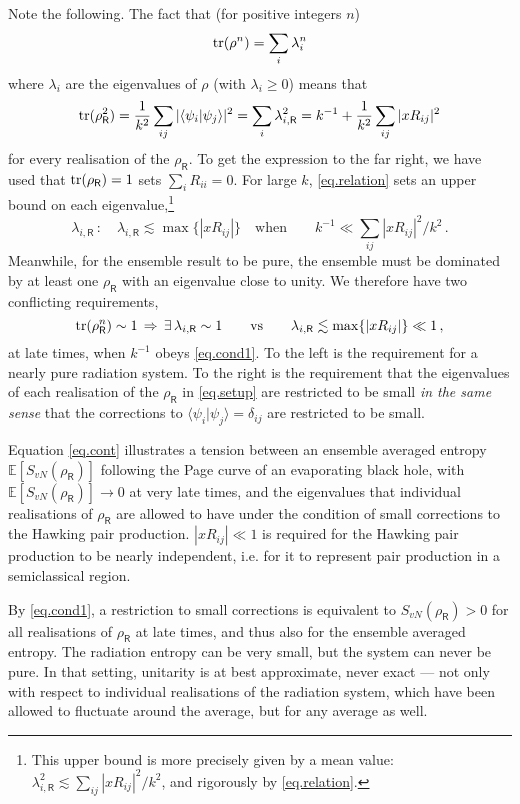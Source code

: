 \documentclass[12pt]{article}
\def\be{\begin{equation}}
\def\ee{\end{equation}}
\numberwithin{equation}{section}
\begin{document}
Note the following. The fact that (for positive integers $n$) 
\be
{\rm tr}(\rho^n)=\sum_i\lambda_i^n
\ee
where $\lambda_i$ are the eigenvalues of $\rho$ (with $\lambda_i\geq0$) means that
\be\label{eq.relation}
{\rm tr}(\rho^2_\textsf{R})=\frac{1}{k^2}\sum_{ij}|\langle\psi_i|\psi_j\rangle|^2=\sum_i\lambda_{i,\textsf{R}}^2= k^{-1}+\frac{1}{k^2}\sum_{ij}|xR_{ij}|^2
\ee
for every realisation of the $\rho_\textsf{R}$. To get the expression to the far right, we have used that ${\rm tr}(\rho_\textsf{R})=1$ sets $\sum_i R_{ii}=0$. For large $k$, \eqref{eq.relation} sets an upper bound on each eigenvalue,\footnote{This upper bound is more precisely given by a mean value: $\lambda_{i,\textsf{R}}^2\lesssim \sum_{ij}|xR_{ij}|^2/k^2$, and rigorously by \eqref{eq.relation}.}
\be\label{eq.cond1}
\lambda_{i,\textsf{R}}\,: \quad \lambda_{i,\textsf{R}} \lesssim \max\{|xR_{ij}|\}\quad\text{when}\qquad k^{-1}\ll \sum_{ij}|xR_{ij}|^2/k^2\,.
\ee
Meanwhile, for the ensemble result to be pure, the ensemble must be dominated by at least one $\rho_\textsf{R}$ with an eigenvalue close to unity. We therefore have two conflicting requirements,
\be\label{eq.cont}
{\rm tr} (\rho_\textsf{R}^n)\sim1\,\Rightarrow \,\exists\, \lambda_{i,\textsf{R}}\sim 1\qquad \text{vs}\qquad\lambda_{i,\textsf{R}} \lesssim \max\{|xR_{ij}|\}\ll1\,,
\ee
at late times, when $k^{-1}$ obeys \eqref{eq.cond1}. To the left is the requirement for a nearly pure radiation system. To the right is the requirement that the eigenvalues of each realisation of the $\rho_\textsf{R}$ in \eqref{eq.setup} are restricted to be small {\it in the same sense} that the corrections to $\langle\psi_i|\psi_j\rangle=\delta_{ij}$ are restricted to be small.

Equation \eqref{eq.cont} illustrates a tension between an ensemble averaged entropy $\mathbb{E}[S_{vN}(\rho_\textsf{R})]$ following the Page curve of an evaporating black hole, with $\mathbb{E}[S_{vN}(\rho_\textsf{R})]\rightarrow0$ at very late times, and the eigenvalues that individual realisations of $\rho_\textsf{R}$ are allowed to have under the condition of small corrections to the Hawking pair production. $|xR_{ij}|\ll1$ is required for the Hawking pair production to be nearly independent, i.e. for it to represent pair production in a semiclassical region.

By \eqref{eq.cond1}, a restriction to small corrections is equivalent to $S_{vN}(\rho_\textsf{R})>0$ for all realisations of $\rho_\textsf{R}$ at late times, and thus also for the ensemble averaged entropy. The radiation entropy can be very small, but the system can never be pure. In that setting, unitarity is at best approximate, never exact --- not only with respect to individual realisations of the radiation system, which have been allowed to fluctuate around the average, but for any average as well.
\end{document}
